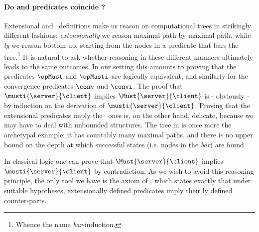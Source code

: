 \paragraph{Do \extensional and  \intentional predicates coincide ?}
Extensional and \intentional\ definitions make us reason on
computational trees in strikingly different fashions:
{\em extensionally} we reason maximal path by maximal path,
while {\em \intentional ly} we reason bottom-up, starting
from the nodes in a predicate that bars the tree.\footnote{Whence the
name {\em bar}-induction.}
It is natural to ask whether reasoning in these different manners
ultimately leads to the same outcomes.
In our setting this amounts to proving that the predicates
$\opMust$ and $\opMusti$ are logically equivalent, and similarly for
the convergence predicates $\conv$ and $\convi$.
The proof that $\musti{\server}{\client}$ implies $\Must{\server}{\client}$ is - obviously - by induction on the derivation
of $\musti{\server}{\client}$.
Proving that the extensional predicates imply the \intentional\ ones
is, on the other hand, delicate, because we may have to deal with unbounded structures.
The tree in  is once more the archetypal example:
it has countably many maximal paths, and there is no upper bound on the
depth at which successful states (i.e. nodes in the {\em bar}) are found.

In classical logic one can prove that
$\Must{\server}{\client}$ implies $\musti
{\server}{\client}$ by contradiction.
%
As we wish to avoid this reasoning principle, the only tool we have
is the axiom of \Barinduction, which states exactly that under
suitable hypotheses, extensionally defined predicates imply their
\intentional ly defined counter-parts.


